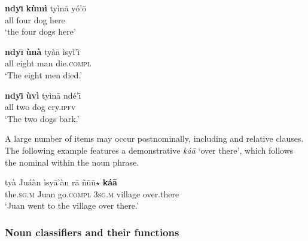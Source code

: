 \documentclass[output=paper,modfonts,nonflat]{langsci/langscibook}
\begin{document}
\ea {}\label{ex:cisneros:39}
\gll
\textbf{ndy\=\i} \textbf{k\`um\`i} ty\`in\=a y\'o'\=o\\
all four dog here\\
\glt
`the four dogs here'
\z 

\ea {}\label{ex:cisneros:40}
\gll
{\ob}\textbf{ndy\=\i} \textbf{\`un\`a} ty\`a\=a{\cb} \`isy\`i'\`i\\
{\db}all eight man die.\textsc{compl}\\
\glt
`The eight men died.'
\z 

\ea {}\label{ex:cisneros:41}
\gll
{\ob}\textbf{ndy\=\i} \textbf{\`uv\`i} ty\`in\=a{\cb} nd\'e'\=\i\\
{\db}all two dog cry.\textsc{ipfv}\\
\glt
`The two dogs bark.'
\z 

\z 

A large number of items may occur postnominally, including  and relative clauses.  The following example features a demonstrative \textit{k\'a\=a} `over there', which follows the nominal within the noun phrase.

\ea {}\label{ex:cisneros:43}
\gll
{\ob}ty\`a Ju\'a\`an{\cb} \`isy\=a'\`an r\=a {\ob}\~n\=u\=u$\star$ \textbf{k\'a\=a}{\cb}\\
{\db}the.\textsc{sg.m} Juan go.\textsc{compl} 3\textsc{sg.m} {\db}village over.there\\
\glt
`Juan went to the village over there.'
\z 
{}

\subsubsection{Noun classifiers and their functions} \label{sec:cisneros:3.3.3}
\end{document}
